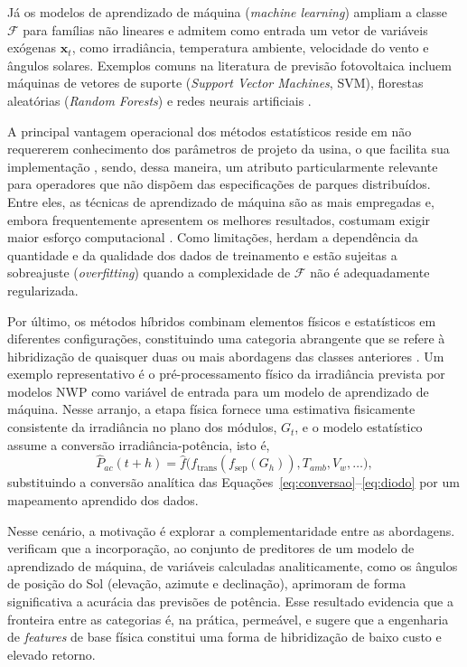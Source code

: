Já os modelos de aprendizado de máquina (\textit{machine learning}) ampliam a classe $\mathcal{F}$ para famílias
não lineares e admitem como entrada um vetor de variáveis exógenas $\mathbf{x}_{t}$, como
irradiância, temperatura ambiente, velocidade do vento e ângulos solares.
Exemplos comuns na literatura de previsão fotovoltaica incluem máquinas de vetores de
suporte (\emph{Support Vector Machines}, SVM), florestas aleatórias (\emph{Random Forests}) e
redes neurais artificiais \cite{Andrade2023}. 

A principal vantagem operacional dos métodos estatísticos reside em não requererem
conhecimento dos parâmetros de projeto da usina, o que facilita sua implementação
\cite{Markovics2022}, sendo, dessa maneira, um atributo particularmente relevante para operadores que não dispõem
das especificações de parques distribuídos. Entre eles, as técnicas de aprendizado de
máquina são as mais empregadas \cite{Markovics2022} e, embora frequentemente apresentem os
melhores resultados, costumam exigir maior esforço computacional \cite{Andrade2023}. Como
limitações, herdam a dependência da quantidade e da qualidade dos dados de treinamento e
estão sujeitas a sobreajuste (\emph{overfitting}) quando a complexidade de $\mathcal{F}$
não é adequadamente regularizada.

Por último, os métodos híbridos combinam elementos físicos e estatísticos em diferentes configurações,
constituindo uma categoria abrangente que se refere à hibridização de quaisquer duas ou
mais abordagens das classes anteriores \cite{Markovics2022,Andrade2023}. Um exemplo
representativo é o pré-processamento físico da irradiância prevista por modelos NWP como
variável de entrada para um modelo de aprendizado de máquina. Nesse arranjo, a etapa física
fornece uma estimativa fisicamente consistente da irradiância no plano dos módulos, $G_{t}$,
e o modelo estatístico assume a conversão irradiância-potência, isto é,
\begin{equation}
    \hat{P}_{ac}(t+h) = \hat{f}\big(f_{\mathrm{trans}}(f_{\mathrm{sep}}(G_{h})),
    T_{amb}, V_{w}, \dots\big),
    \label{eq:hibrido}
\end{equation}
substituindo a conversão analítica das Equações~\eqref{eq:conversao}--\eqref{eq:diodo} por
um mapeamento aprendido dos dados.

Nesse cenário, a motivação é explorar a complementaridade entre as abordagens. 
verificam que a incorporação, ao conjunto de preditores de um modelo de aprendizado de
máquina, de variáveis calculadas analiticamente, como os ângulos de posição do Sol
(elevação, azimute e declinação), aprimoram de forma significativa a acurácia das previsões
de potência. Esse resultado evidencia que a fronteira entre as categorias é, na prática,
permeável, e sugere que a engenharia de \emph{features} de base física constitui uma forma
de hibridização de baixo custo e elevado retorno.

